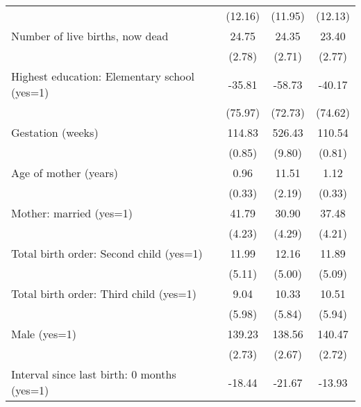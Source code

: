 {\begin{tabular}{l*{4}{c}}
                                                  &            &     (12.16)&     (11.95)&     (12.13)\\
Number of live births, now dead                   &            &       24.75&       24.35&       23.40\\
                                                  &            &      (2.78)&      (2.71)&      (2.77)\\
Highest education: Elementary school (yes=1)      &            &      -35.81&      -58.73&      -40.17\\
                                                  &            &     (75.97)&     (72.73)&     (74.62)\\
Gestation (weeks)                                 &            &      114.83&      526.43&      110.54\\
                                                  &            &      (0.85)&      (9.80)&      (0.81)\\
Age of mother (years)                             &            &        0.96&       11.51&        1.12\\
                                                  &            &      (0.33)&      (2.19)&      (0.33)\\
Mother: married (yes=1)                           &            &       41.79&       30.90&       37.48\\
                                                  &            &      (4.23)&      (4.29)&      (4.21)\\
Total birth order: Second child (yes=1)           &            &       11.99&       12.16&       11.89\\
                                                  &            &      (5.11)&      (5.00)&      (5.09)\\
Total birth order: Third child (yes=1)            &            &        9.04&       10.33&       10.51\\
                                                  &            &      (5.98)&      (5.84)&      (5.94)\\
Male (yes=1)                                      &            &      139.23&      138.56&      140.47\\
                                                  &            &      (2.73)&      (2.67)&      (2.72)\\
Interval since last birth: 0 months (yes=1)       &            &      -18.44&      -21.67&      -13.93\\

\end{tabular}}
